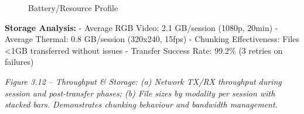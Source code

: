 \documentclass[12pt,a4paper]{article}
\begin{document}
\begin{figure}
\centering
{}
\caption{Battery/Resource Profile}
\end{figure}

\textbf{Storage Analysis:} - Average RGB Video: 2.1 GB/session (1080p, 20min) - Average Thermal: 0.8 GB/session (320x240, 15fps) - Chunking Effectiveness: Files \textless1GB transferred without issues - Transfer Success Rate: 99.2\% (3 retries on failures)

\emph{Figure 3.12 -- Throughput \& Storage: (a) Network TX/RX throughput during session and post-transfer phases; (b) File sizes by modality per session with stacked bars. Demonstrates chunking behaviour and bandwidth management.}
\end{document}

